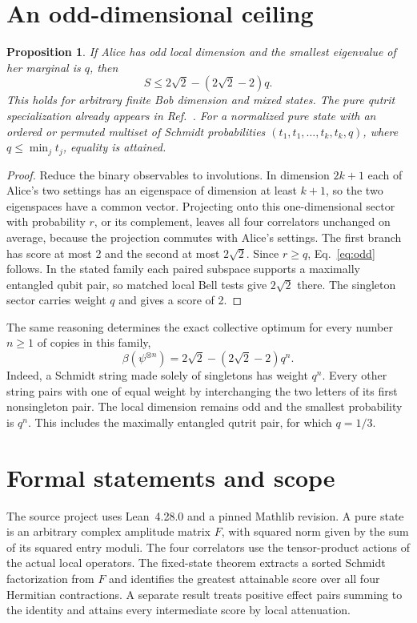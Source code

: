 \documentclass[11pt]{article}
\newtheorem{proposition}[theorem]{Proposition}
\begin{document}
\section{An odd-dimensional ceiling}
\begin{proposition}\label{prop:odd}
If Alice has odd local dimension and the smallest eigenvalue of her marginal is $q$, then
\begin{equation}
       S\le 2\sqrt2-(2\sqrt2-2)q .                         \label{eq:odd}
\end{equation}
This holds for arbitrary finite Bob dimension and mixed states. The pure qutrit specialization already appears in Ref.~\cite{pollard}. For a normalized pure state with an ordered or permuted multiset of Schmidt probabilities
$(t_1,t_1,\ldots,t_k,t_k,q)$, where $q\le\min_j t_j$, equality is attained.
\end{proposition}
\begin{proof}
Reduce the binary observables to involutions. In dimension $2k+1$ each of Alice's two settings has an eigenspace of dimension at least $k+1$, so the two eigenspaces have a common vector. Projecting onto this one-dimensional sector with probability $r$, or its complement, leaves all four correlators unchanged on average, because the projection commutes with Alice's settings. The first branch has score at most 2 and the second at most $2\sqrt2$. Since $r\ge q$, Eq.~\eqref{eq:odd} follows. In the stated family each paired subspace supports a maximally entangled qubit pair, so matched local Bell tests give $2\sqrt2$ there. The singleton sector carries weight $q$ and gives a score of 2.
\end{proof}

The same reasoning determines the exact collective optimum for every number $n\ge1$ of copies in this family,
\[
       \beta(\psi^{\otimes n})=2\sqrt2-(2\sqrt2-2)q^n.
\]
Indeed, a Schmidt string made solely of singletons has weight $q^n$. Every other string pairs with one of equal weight by interchanging the two letters of its first nonsingleton pair. The local dimension remains odd and the smallest probability is $q^n$. This includes the maximally entangled qutrit pair, for which $q=1/3$.

\section{Formal statements and scope}
The source project uses Lean~4.28.0 and a pinned Mathlib revision. A pure state is an arbitrary complex amplitude matrix $F$, with squared norm given by the sum of its squared entry moduli. The four correlators use the tensor-product actions of the actual local operators. The fixed-state theorem extracts a sorted Schmidt factorization from $F$ and identifies the greatest attainable score over all four Hermitian contractions. A separate result treats positive effect pairs summing to the identity and attains every intermediate score by local attenuation.
\end{document}
